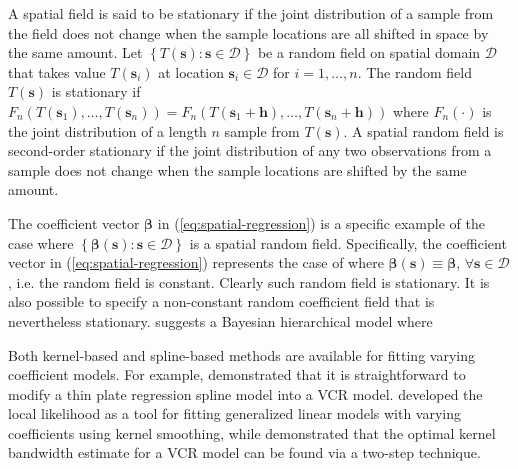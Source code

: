 \documentclass[authoryear, review, 11pt]{elsarticle}
\begin{document}
	A spatial field is said to be stationary if the joint distribution of a sample from the field does not change when the sample locations are all shifted in space by the same amount. Let $\left\{T(\bm{s}) : \bm{s} \in \mathcal{D}\right\}$ be a random field on spatial domain $\mathcal{D}$ that takes value $T(\bm{s}_i)$ at location $\bm{s}_i \in \mathcal{D}$ for $i = 1, \dots, n$. The random field $T(\bm{s})$ is stationary if $F_n\left(T(\bm{s}_1), \dots, T(\bm{s}_n)\right) = F_n\left(T(\bm{s}_1+\bm{h}), \dots, T(\bm{s}_n+\bm{h})\right)$ where $F_n(\cdot)$ is the joint distribution of a length $n$ sample from $T(\bm{s})$. A spatial random field is second-order stationary if the joint distribution of any two observations from a sample does not change when the sample locations are shifted by the same amount.
	
	The coefficient vector $\bm{\beta}$ in (\ref{eq:spatial-regression}) is a specific example of the case where $\left\{\bm{\beta}(\bm{s}) : \bm{s} \in \mathcal{D}\right\}$ is a spatial random field. Specifically, the coefficient vector in (\ref{eq:spatial-regression}) represents the case of where $\bm{\beta}(\bm{s}) \equiv \bm{\beta}$, $\forall \bm{s} \in \mathcal{D}$, i.e. the random field is constant. Clearly such random field is stationary. It is also possible to specify a non-constant random coefficient field that is nevertheless stationary. \cite{Gelfand:2003} suggests a Bayesian hierarchical model where 


	Both kernel-based and spline-based methods are available for fitting varying coefficient models. For example, \cite{Wood:2006} demonstrated that it is straightforward to modify a thin plate regression spline model into a VCR model. \cite{Loader:1999} developed the local likelihood as a tool for fitting generalized linear models with varying coefficients using kernel smoothing, while \cite{Fan:1999} demonstrated that the optimal kernel bandwidth estimate for a VCR model can be found via a two-step technique.
	
\end{document}
